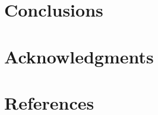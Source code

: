 \documentclass[preprint,authoryear,review,12pt]{elsarticle}
\begin{document}
\section*{Conclusions}





\section*{Acknowledgments}

\section*{References}










\end{document}
